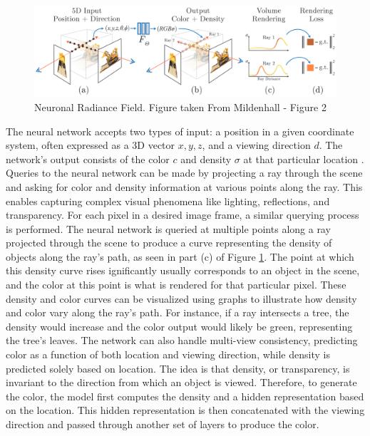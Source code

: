 \begin{figure}[ht]
    \centering
      \includegraphics[width=1\columnwidth]{figures/NeRF_Fig_2_Mildenhall.png}
      \caption{Neuronal Radiance Field. Figure taken From Mildenhall \cite{mildenhallNERF} - Figure 2}
      \label{fig:figureNeRF}
\end{figure}

The neural network accepts two types of input: a position in a given coordinate system, often expressed as a 3D vector \(x, y, z\), and a viewing direction \(d\). The network's output consists of the color \(c\) and density \( \sigma \) at that particular location \citep{mildenhallNERF}. Queries to the neural network can be made by projecting a ray through the scene and asking for color and density information at various points along the ray. This enables capturing complex visual phenomena like lighting, reflections, and transparency. 
For each pixel in a desired image frame, a similar querying process is performed. The neural network is queried at multiple points along a ray projected through the scene to produce a curve representing the density of objects along the ray's path, as seen in part (c) of Figure \ref{fig:figureNeRF}. The point at which this density curve rises ignificantly usually corresponds to an object in the scene, and the color at this point is what is rendered for that particular pixel. These density and color curves can be visualized using graphs to illustrate how density and color vary along the ray's path. For instance, if a ray intersects a tree, the density would increase and the color output would likely be green, representing the tree's leaves. 
The network can also handle multi-view consistency, predicting color as a function of both location and viewing direction, while density is predicted solely based on location. The idea is that density, or transparency, is invariant to the direction from which an object is viewed. Therefore, to generate the color, the model first computes the density and a hidden representation based on the location. This hidden representation is then concatenated with the viewing direction and passed through another set of layers to produce the color.

